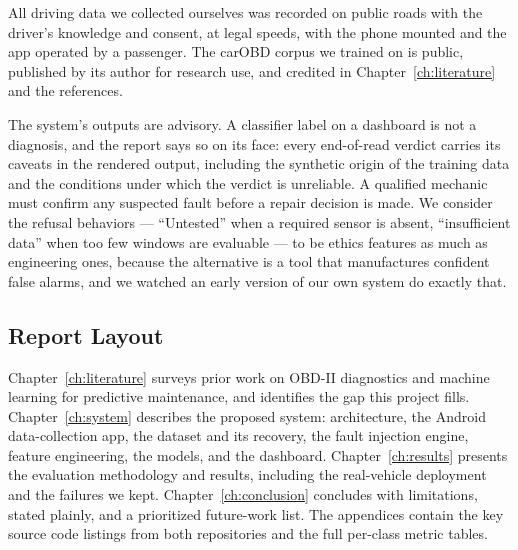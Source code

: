 All driving data we collected ourselves was recorded on public roads with
the driver's knowledge and consent, at legal speeds, with the phone mounted
and the app operated by a passenger. The carOBD corpus we trained on is
public, published by its author for research use, and credited in
Chapter~\ref{ch:literature} and the references.

The system's outputs are advisory. A classifier label on a dashboard is not
a diagnosis, and the report says so on its face: every end-of-read verdict
carries its caveats in the rendered output, including the synthetic origin
of the training data and the conditions under which the verdict is
unreliable. A qualified mechanic must confirm any suspected fault before a
repair decision is made. We consider the refusal behaviors --- ``Untested''
when a required sensor is absent, ``insufficient data'' when too few windows
are evaluable --- to be ethics features as much as engineering ones, because
the alternative is a tool that manufactures confident false alarms, and we
watched an early version of our own system do exactly that.

\subsection{Report Layout}

Chapter~\ref{ch:literature} surveys prior work on OBD-II diagnostics and
machine learning for predictive maintenance, and identifies the gap this
project fills. Chapter~\ref{ch:system} describes the proposed system:
architecture, the Android data-collection app, the dataset and its recovery,
the fault injection engine, feature engineering, the models, and the
dashboard. Chapter~\ref{ch:results} presents the evaluation methodology and
results, including the real-vehicle deployment and the failures we kept.
Chapter~\ref{ch:conclusion} concludes with limitations, stated plainly, and
a prioritized future-work list. The appendices contain the key source code
listings from both repositories and the full per-class metric tables.
